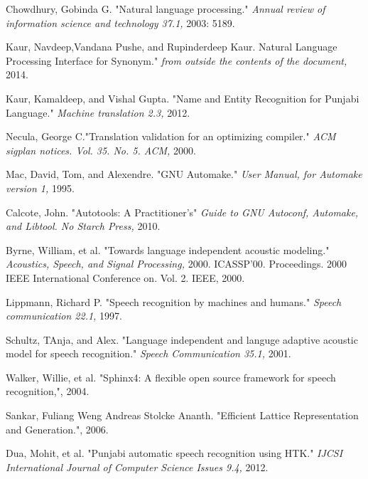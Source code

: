 \documentclass[12pt,a4paper,oneside]{memoir}
\begin{document}


%
%



\begin{thebibliography}{9}

Chowdhury, Gobinda G. 
"Natural language processing."
\textit{Annual review of information science and technology 37.1,} 2003: 5189.

Kaur, Navdeep,Vandana Pushe, and Rupinderdeep Kaur.
Natural Language Processing Interface for Synonym."
\textit{from outside the contents of the document,} 2014.

Kaur, Kamaldeep, and Vishal Gupta.
"Name and Entity Recognition for Punjabi Language."
\textit{Machine translation 2.3,} 2012.

Necula, George C."Translation validation for an optimizing compiler."
\textit{ACM sigplan notices. Vol. 35. No. 5. ACM,} 2000.


Mac, David, Tom, and Alexendre. "GNU Automake."
\textit{User Manual, for Automake version 1,} 1995.

 Calcote, John. "Autotools: A Practitioner's"
\textit{Guide to GNU Autoconf, Automake, and Libtool. No Starch Press,} 2010.

Byrne, William, et al. "Towards language independent acoustic modeling."
\textit{Acoustics, Speech, and Signal Processing,} 2000. ICASSP'00. Proceedings. 2000 IEEE International Conference on. Vol. 2. IEEE, 2000.

Lippmann, Richard P. "Speech recognition by machines and humans."
\textit{Speech communication 22.1,} 1997.

 Schultz, TAnja, and Alex. "Language independent and languge adaptive acoustic model for speech recognition."
\textit{Speech Communication 35.1,} 2001.

 Walker, Willie, et al. "Sphinx4: A flexible open source framework for speech recognition,", 2004.
\textit{}

Sankar, Fuliang Weng Andreas Stolcke Ananth. "Efficient Lattice Representation and Generation.", 2006.
\textit{}

 Dua, Mohit, et al. "Punjabi automatic speech recognition using HTK."
\textit{IJCSI International Journal of Computer Science Issues 9.4,} 2012.



\end{thebibliography}
\end{document}

